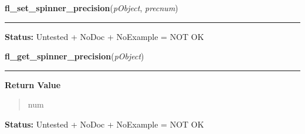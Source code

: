     \vspace{0.5ex}

\hspace{.8\funcindent}\begin{boxedminipage}{\funcwidth}

    \raggedright \textbf{fl\_set\_spinner\_precision}(\textit{pObject}, \textit{precnum})

    \vspace{-1.5ex}

    \rule{\textwidth}{0.5\fboxrule}
\setlength{\parskip}{2ex}
\setlength{\parskip}{1ex}
\textbf{Status:} Untested + NoDoc + NoExample = NOT OK



    \end{boxedminipage}

    \label{xformslib:library:fl_get_spinner_precision}

    \vspace{0.5ex}

\hspace{.8\funcindent}\begin{boxedminipage}{\funcwidth}

    \raggedright \textbf{fl\_get\_spinner\_precision}(\textit{pObject})

    \vspace{-1.5ex}

    \rule{\textwidth}{0.5\fboxrule}
\setlength{\parskip}{2ex}
\setlength{\parskip}{1ex}
      \textbf{Return Value}
    \vspace{-1ex}

      \begin{quote}
      num

      \end{quote}

\textbf{Status:} Untested + NoDoc + NoExample = NOT OK



    \end{boxedminipage}

    \label{xformslib:library:fl_get_spinner_input}

    \vspace{0.5ex}

